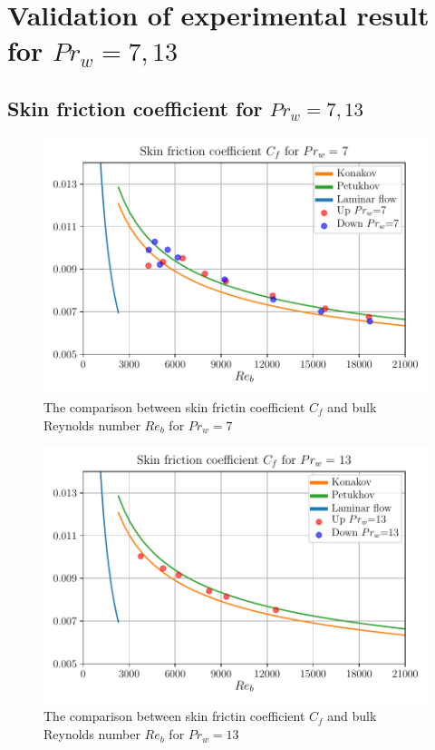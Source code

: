 \documentclass[12pt,oneside]{jbook}
\begin{document}
\section{Validation of experimental result for $Pr_{w}=7, 13$}
\subsection{Skin friction coefficient for $Pr_{w}=7, 13$}

\begin{figure}[ht]
	\vspace{0zh}
	\begin{center}
		\includegraphics[width=0.9\linewidth]{fig/pr7_recf.pdf}
		\vspace{-1zh}
		\caption{The comparison between skin frictin coefficient $C_{f}$ and bulk Reynolds number $Re_{b}$ for $Pr_{w} = 7$}
		\label{pr7_recf}
	\end{center}
	\vspace{0zh}
\end{figure}

\begin{figure}[ht]
	\vspace{0zh}
	\begin{center}
		\includegraphics[width=0.9\linewidth]{fig/pr13_recf.pdf}
		\vspace{-1zh}
		\caption{The comparison between skin frictin coefficient $C_{f}$ and bulk Reynolds number $Re_{b}$ for $Pr_{w} = 13$}
		\label{pr13_recf}
	\end{center}
	\vspace{0zh}
\end{figure}
\end{document}
